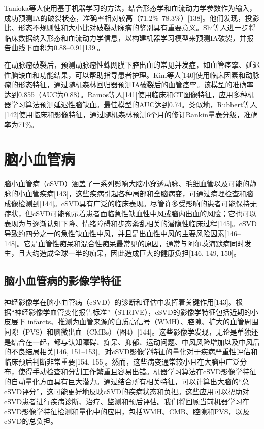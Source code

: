 \documentclass[11pt]{article}
\begin{document}
Tanioka等人使用基于机器学习的方法，结合形态学和血流动力学参数作为输入，成功预测IA的破裂状态，准确率相对较高（71.2\%–78.3\%）[138]。他们发现，投影比、形态不规则性和大小比对破裂动脉瘤的鉴别具有重要意义。Shi等人进一步将临床数据纳入形态和血流动力学信息，以构建机器学习模型来预测IA破裂，并报告曲线下面积为0.88–0.91[139]。

在动脉瘤破裂后，预测动脉瘤性蛛网膜下腔出血的常见并发症，如血管痉挛、延迟性脑缺血和功能结果，可以帮助指导患者护理。Kim等人[140]使用临床因素和动脉瘤的形态特征，通过随机森林回归器预测IA破裂后的血管痉挛。该模型的准确率达到0.855（AUC为0.88）。Ramos等人[141]使用临床和CT图像特征，应用多种机器学习算法预测延迟性脑缺血。最佳模型的AUC达到0.74。类似地，Rubbert等人[142]使用临床和影像特征，通过随机森林预测6个月的修订Rankin量表分级，准确率为71\%。

\section{\kaishu 脑小血管病}

脑小血管病（cSVD）涵盖了一系列影响大脑小穿透动脉、毛细血管以及可能的静脉的小血管疾病[143]，这些疾病引起各种局部和全脑病变，可通过病理检查和脑成像检测到[144]。cSVD具有广泛的临床表现。尽管许多受影响的患者可能保持无症状，但cSVD可能预示着患者面临急性缺血性中风或脑内出血的风险；它也可以表现为与逐渐认知下降、情绪障碍和步态紊乱相关的潜隐性临床过程[145]。cSVD导致约四分之一的急性缺血性中风，并且是出血性中风的主要风险因素[146–148]。它是血管性痴呆和混合性痴呆最常见的原因，通常与阿尔茨海默病同时发生，且大约造成全球一半的痴呆，因此造成巨大的健康负担[146, 149, 150]。

\subsection{\kaishu 脑小血管病的影像学特征}

神经影像学在脑小血管病（cSVD）的诊断和评估中发挥着关键作用[143]。根据“神经影像学血管变化报告标准”（STRIVE），cSVD的影像学特征包括近期的小皮层下 infarcts、推测为血管来源的白质高信号（WMH）、腔隙、扩大的血管周围间隙（PVS）和脑微出血（CMBs）（图4）[144]。这些影像学发现，无论是单独还是结合在一起，都与认知障碍、痴呆、抑郁、运动问题、中风风险增加以及中风后的不良结局相关[146, 151–153]。对cSVD影像学特征的量化对于疾病严重性评估和临床预后判断非常重要[154, 155]。然而，这些病变通常较小且在大脑中广泛分布，使得手动检查和分割工作繁重且容易出错。机器学习算法在cSVD影像学特征的自动量化方面具有巨大潜力。通过结合所有相关特征，可以计算出大脑的“总cSVD评分”，这可能更好地反映cSVD的疾病状态和负担。这些应用可以帮助对cSVD患者进行疾病诊断、治疗、监测和预后评估。我们将回顾当前机器学习在cSVD影像学特征检测和量化中的应用，包括WMH、CMB、腔隙和PVS，以及cSVD的总负担。
\end{document}
